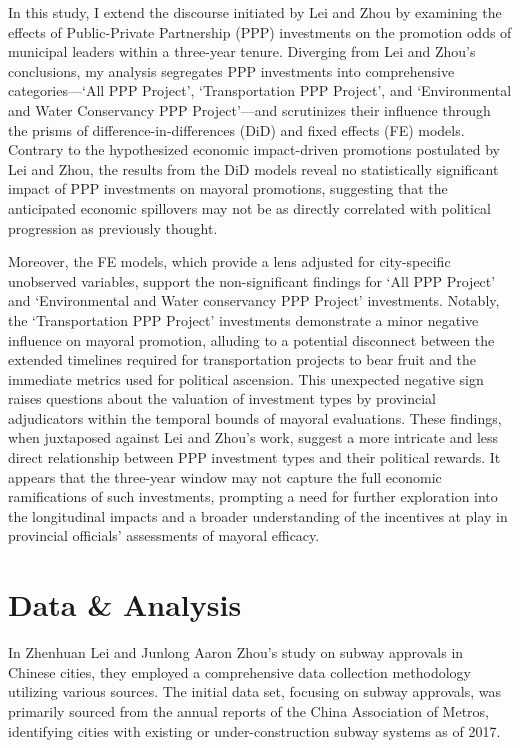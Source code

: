 \documentclass[12pt, ]{article}
\begin{document}
In this study, I extend the discourse initiated by Lei and Zhou by
examining the effects of Public-Private Partnership (PPP) investments on
the promotion odds of municipal leaders within a three-year tenure.
Diverging from Lei and Zhou's conclusions, my analysis segregates PPP
investments into comprehensive categories---`All PPP Project',
`Transportation PPP Project', and `Environmental and Water Conservancy
PPP Project'---and scrutinizes their influence through the prisms of
difference-in-differences (DiD) and fixed effects (FE) models. Contrary
to the hypothesized economic impact-driven promotions postulated by Lei
and Zhou, the results from the DiD models reveal no statistically
significant impact of PPP investments on mayoral promotions, suggesting
that the anticipated economic spillovers may not be as directly
correlated with political progression as previously thought.

Moreover, the FE models, which provide a lens adjusted for city-specific
unobserved variables, support the non-significant findings for `All PPP
Project' and `Environmental and Water conservancy PPP Project'
investments. Notably, the `Transportation PPP Project' investments
demonstrate a minor negative influence on mayoral promotion, alluding to
a potential disconnect between the extended timelines required for
transportation projects to bear fruit and the immediate metrics used for
political ascension. This unexpected negative sign raises questions
about the valuation of investment types by provincial adjudicators
within the temporal bounds of mayoral evaluations. These findings, when
juxtaposed against Lei and Zhou's work, suggest a more intricate and
less direct relationship between PPP investment types and their
political rewards. It appears that the three-year window may not capture
the full economic ramifications of such investments, prompting a need
for further exploration into the longitudinal impacts and a broader
understanding of the incentives at play in provincial officials'
assessments of mayoral efficacy.

\hypertarget{data-analysis}{%
\section{Data \& Analysis}\label{data-analysis}}

In Zhenhuan Lei and Junlong Aaron Zhou's study on subway approvals in
Chinese cities, they employed a comprehensive data collection
methodology utilizing various sources. The initial data set, focusing on
subway approvals, was primarily sourced from the annual reports of the
China Association of Metros, identifying cities with existing or
under-construction subway systems as of 2017.
\end{document}
